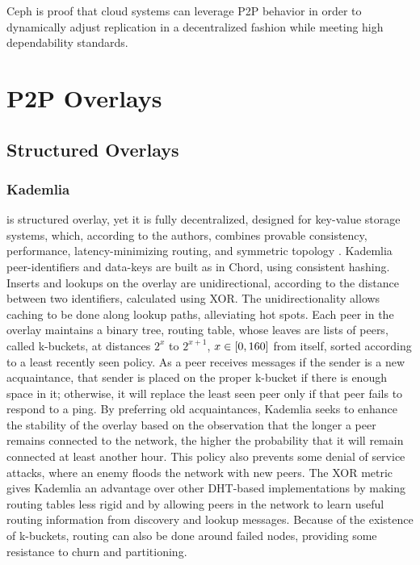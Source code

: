 \documentclass[runningheads]{llncs}
\begin{document}
Ceph is proof that cloud systems can leverage P2P behavior in order to dynamically adjust replication in a decentralized fashion while meeting high dependability standards. \cite{ceph, ceph_benchmarks}

\newpage\section{P2P Overlays}
\subsection{Structured Overlays}
\subsubsection{Kademlia} \cite{kademlia} is structured overlay, yet it is fully decentralized, designed for key-value storage systems, which, according to the authors, combines provable consistency, performance, latency-minimizing routing, and symmetric topology \cite{kademlia}. Kademlia peer-identifiers and data-keys are built as in Chord\cite{chord}, using consistent hashing. Inserts and lookups on the overlay are unidirectional, according to the distance between two identifiers, calculated using XOR. The unidirectionality allows caching to be done along lookup paths, alleviating hot spots. Each peer in the overlay maintains a binary tree, routing table, whose leaves are lists of peers, called k-buckets, at distances $2^{x}$ to $2^{x+1}$, $x \in\hspace{1mm}\mathclose[0,160\mathclose]$ from itself, sorted according to a least recently seen policy. As a peer receives messages if the sender is a new acquaintance, that sender is placed on the proper k-bucket if there is enough space in it; otherwise, it will replace the least seen peer only if that peer fails to respond to a ping. By preferring old acquaintances, Kademlia seeks to enhance the stability of the overlay based on the observation that the longer a peer remains connected to the network, the higher the probability that it will remain connected at least another hour\cite{ssaroiu:msp2pfss}. This policy also prevents some denial of service attacks, where an enemy floods the network with new peers. The XOR metric gives Kademlia an advantage over other DHT-based implementations by making routing tables less rigid and by allowing peers in the network to learn useful routing information from discovery and lookup messages. Because of the existence of k-buckets, routing can also be done around failed nodes, providing some resistance to churn and partitioning.
\end{document}
